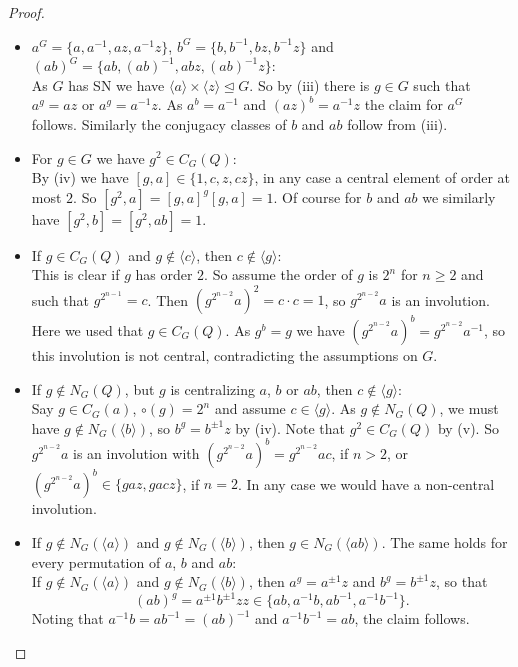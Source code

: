 \documentclass[a4paper,10pt]{amsart}
\theoremstyle{definition}
\theoremstyle{remark}
\begin{document}
\begin{proof}
\begin{itemize}
\item[(iv)] $a^G = \{a, a^{-1}, az, a^{-1}z \}$, $b^G = \{b, b^{-1}, bz, b^{-1}z \}$ and $(ab)^G = \{ab, (ab)^{-1}, abz, (ab)^{-1}z \}$:\\
As $G$ has SN we have $\langle a \rangle \times \langle z \rangle \unlhd G$. So by (iii) there is $g \in G$ such that $a^g = az$ or $a^g = a^{-1}z$. As $a^b = a^{-1}$ and $(az)^b = a^{-1}z$ the claim for $a^G$ follows. Similarly the conjugacy classes of $b$ and $ab$ follow from (iii).

\item[(v)] For $g \in G$ we have $g^2 \in C_G(Q)$:\\
By (iv) we have $[g,a] \in \{1,c, z, cz \}$, in any case a central element of order at most $2$. So $[g^2, a] = [g,a]^g[g,a] = 1$. Of course for $b$ and $ab$ we similarly have $[g^2,b] = [g^2, ab] =1$.

\item[(vi)] If $g \in C_G(Q)$ and $g \notin \langle c \rangle$, then $c \notin \langle g \rangle$:\\
This is clear if $g$ has order $2$. So assume the order of $g$ is $2^n$ for $n \geq 2$ and such that $g^{2^{n-1}} = c$. Then $(g^{2^{n-2}}a)^2 = c\cdot c = 1$, so $g^{2^{n-2}}a$ is an involution. Here we used that $g \in C_G(Q)$. As $g^b = g$ we have $(g^{2^{n-2}}a)^b = g^{2^{n-2}}a^{-1}$, so this involution is not central, contradicting the assumptions on $G$.

\item[(vii)] If $g \notin N_G(Q)$, but $g$ is centralizing $a$, $b$ or $ab$, then $c \notin \langle g \rangle$:\\
Say $g \in C_G(a)$, $\circ(g) = 2^n$ and assume $c \in \langle g \rangle$. As $g\notin N_G(Q)$, we must have $g \notin N_G(\langle b \rangle)$, so $b^g = b^{\pm 1}z$ by (iv). Note that $g^2 \in C_G(Q)$ by (v). So $g^{2^{n-2}}a$ is an involution with $(g^{2^{n-2}}a)^b = g^{2^{n-2}}ac$, if $n > 2$, or $(g^{2^{n-2}}a)^b \in \{gaz, gacz \}$, if $n=2$. In any case we would have a non-central involution.

\item[(viii)] If $g \notin N_G(\langle a \rangle)$ and $g \notin N_G(\langle b \rangle)$, then $g \in N_G(\langle ab \rangle)$. The same holds for every permutation of $a$, $b$ and $ab$:\\
If $g \notin N_G(\langle a \rangle)$ and $g \notin N_G(\langle b \rangle)$, then $a^g = a^{\pm 1}z$ and $b^g = b^{\pm 1}z$, so that
\[(ab)^g = a^{\pm 1}b^{\pm 1} z z \in \{ab, a^{-1}b, ab^{-1}, a^{-1}b^{-1} \}. \]
Noting that $a^{-1}b = ab^{-1} = (ab)^{-1}$ and $a^{-1}b^{-1} = ab$, the claim follows.


\end{itemize}
\end{proof}
\end{document}
